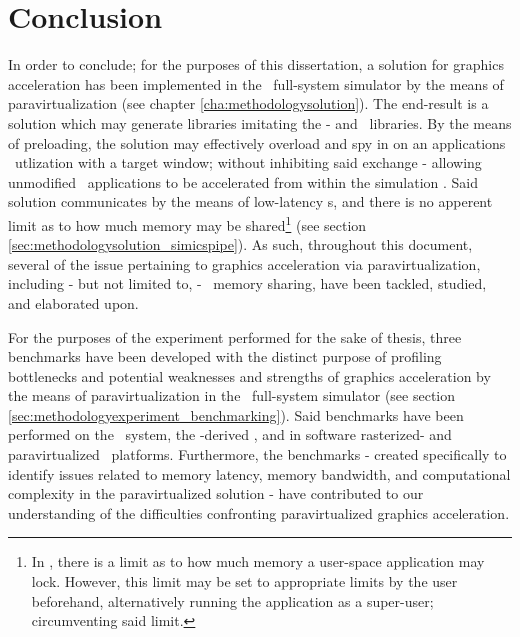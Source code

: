 
\chapter{Conclusion}
\label{cha:conclusion}





In order to conclude; for the purposes of this dissertation, a solution for graphics acceleration has been implemented in the \dvttermsimics\ full-system simulator by the means of paravirtualization (see chapter \ref{cha:methodologysolution}).
The end-result is a solution which may generate libraries imitating the \dvttermegl - and \dvttermopenglestwopointo\ libraries.
By the means of preloading, the solution may effectively overload and spy in on an applications \dvttermegl\ utlization with a target window; without inhibiting said exchange - allowing unmodified \dvttermopengl\ applications to be accelerated from within the simulation \dvttermtarget .
Said solution communicates by the means of low-latency \dvttermmagicinstruction s, and there is no apperent limit as to how much memory may be shared\footnote{In \dvttermlinux , there is a limit as to how much memory a user-space application may lock. However, this limit may be set to appropriate limits by the user beforehand, alternatively running the application as a super-user; circumventing said limit.} (see section \ref{sec:methodologysolution_simicspipe}).
As such, throughout this document, several of the issue pertaining to graphics acceleration via paravirtualization, including - but not limited to, \dvttermtarget - \dvttermhost\ memory sharing, have been tackled, studied, and elaborated upon.

For the purposes of the experiment performed for the sake of thesis, three benchmarks have been developed with the distinct purpose of profiling bottlenecks and potential weaknesses and strengths of graphics acceleration by the means of paravirtualization in the \dvttermsimics\ full-system simulator (see section \ref{sec:methodologyexperiment_benchmarking}).
Said benchmarks have been performed on the \dvttermhost\ system, the \dvttermqemu -derived \dvttermandroidemulator , and in software rasterized- and paravirtualized \dvttermsimics\ platforms.
Furthermore, the benchmarks - created specifically to identify issues related to memory latency, memory bandwidth, and computational complexity in the paravirtualized solution - have contributed to our understanding of the difficulties confronting paravirtualized graphics acceleration.

